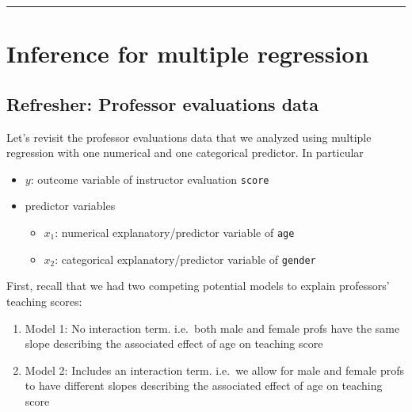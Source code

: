 \documentclass[12pt, krantz2,]{krantz}
\makeatletter
\newenvironment{Shaded}{\begin{snugshade}}{\end{snugshade}}
\newcommand{\KeywordTok}[1]{\textcolor[rgb]{0.27,0.27,0.27}{\textbf{#1}}}
\newcommand{\NormalTok}[1]{#1}
\newcommand{\OperatorTok}[1]{\textcolor[rgb]{0.43,0.43,0.43}{\textbf{#1}}}
\newcommand{\StringTok}[1]{\textcolor[rgb]{0.5,0.5,0.5}{#1}}
\providecommand{\tightlist}{%
  \setlength{\itemsep}{0pt}\setlength{\parskip}{0pt}}
\newenvironment{kframe}{%
\medskip{}
\setlength{\fboxsep}{.8em}
 \def\at@end@of@kframe{}%
 \ifinner\ifhmode%
  \def\at@end@of@kframe{\end{minipage}}%
  \begin{minipage}{\columnwidth}%
 \fi\fi%
 \def\FrameCommand##1{\hskip\@totalleftmargin \hskip-\fboxsep
 \colorbox{shadecolor}{##1}\hskip-\fboxsep
     \hskip-\linewidth \hskip-\@totalleftmargin \hskip\columnwidth}%
 \MakeFramed {\advance\hsize-\width
   \@totalleftmargin\z@ \linewidth\hsize
   \@setminipage}}%
 {\par\unskip\endMakeFramed%
 \at@end@of@kframe}
\renewenvironment{Shaded}{\begin{kframe}}{\end{kframe}}
\makeatother
\begin{document}
\begin{center}\rule{0.5\linewidth}{\linethickness}\end{center}

\hypertarget{inference-for-multiple-regression}{%
\section{Inference for multiple regression}\label{inference-for-multiple-regression}}

\hypertarget{refresher-professor-evaluations-data}{%
\subsection{Refresher: Professor evaluations data}\label{refresher-professor-evaluations-data}}

Let's revisit the professor evaluations data that we analyzed using multiple regression with one numerical and one categorical predictor. In particular

\begin{itemize}
\tightlist
\item
  \(y\): outcome variable of instructor evaluation \texttt{score}
\item
  predictor variables

  \begin{itemize}
  \tightlist
  \item
    \(x_1\): numerical explanatory/predictor variable of \texttt{age}
  \item
    \(x_2\): categorical explanatory/predictor variable of \texttt{gender}
  \end{itemize}
\end{itemize}

\begin{Shaded}
\end{Shaded}

First, recall that we had two competing potential models to explain professors'
teaching scores:

\begin{enumerate}
\def\labelenumi{\arabic{enumi}.}
\tightlist
\item
  Model 1: No interaction term. i.e.~both male and female profs have the same slope describing the associated effect of age on teaching score
\item
  Model 2: Includes an interaction term. i.e.~we allow for male and female profs to have different slopes describing the associated effect of age on teaching score
\end{enumerate}
\end{document}
